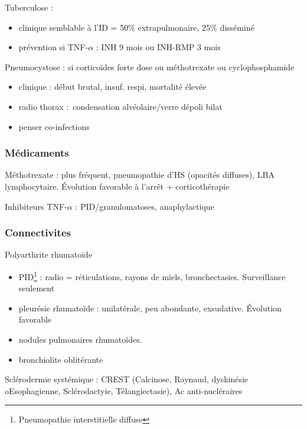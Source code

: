 \documentclass[11pt]{article}
\begin{document}
Tuberculose : 

\begin{itemize}
\item clinique semblable à l'ID = 50\% extrapulmonaire, 25\% disséminé
\item prévention si TNF-\(\alpha\) : INH 9 mois ou INH-RMP 3 mois
\end{itemize}

Pneumocystose : si corticoïdes forte dose ou méthotrexate ou
cyclophosphamide

\begin{itemize}
\item clinique : début brutal, insuf. respi, mortalité élevée
\item radio thorax : condensation alvéolaire/verre dépoli bilat
\item penser co-infections
\end{itemize}

\subsubsection{Médicaments}
\label{sec:org45eefe5}
Méthotrexate : plus fréquent, pneumopathie d'HS (opacités diffuses), \gls{LBA}
lymphocytaire. Évolution favorable à l'arrêt + corticothérapie

Inhibiteurs TNF-\(\alpha\) : PID/granulomatoses, anaphylactique

\subsubsection{Connectivites}
\label{sec:org3b64835}
Polyarthrite rhumatoide

\begin{itemize}
\item PID\footnote{Pneumopathie interstitielle diffuse} : radio =
réticulations, rayons de miels, bronchectasies. Surveillance seulement
\item pleurésie rhumatoïde : unilatérale, peu abondante, exsudative. Évolution
favorable
\item nodules pulmonaires rhumatoïdes.
\item bronchiolite oblitérante
\end{itemize}

Sclérodermie systémique : CREST (Calcinose, Raynaud, dyskinésie oEsophagienne,
Sclérodactyie, Télangiectasie), Ac anti-nucléraires

\end{document}
